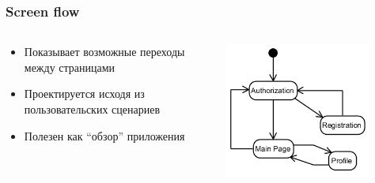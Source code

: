 \documentclass[xetex,mathserif,serif]{beamer}
\begin{document}
	\begin{frame}
		\frametitle{Screen flow}
		\begin{columns}
			\begin{column}{0.6\textwidth}
				\begin{itemize}
					\item Показывает возможные переходы между страницами
					\item Проектируется исходя из пользовательских сценариев
					\item Полезен как ``обзор'' приложения
				\end{itemize}
			\end{column}
			\begin{column}{0.4\textwidth}
				\begin{center}
					\includegraphics[width=0.8\textwidth]{screenFlow.png}
				\end{center}
			\end{column}
		\end{columns}
	\end{frame}
\end{document}
